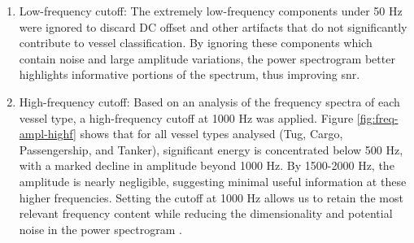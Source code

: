 \begin{enumerate}
    \item Low-frequency cutoff: The extremely low-frequency components under 50 Hz were ignored to discard DC offset and other artifacts that do not significantly contribute to vessel classification. By ignoring these components which contain noise and large amplitude variations, the power spectrogram better highlights informative portions of the spectrum, thus improving \acrshort{snr}.
    \item High-frequency cutoff: Based on an analysis of the frequency spectra of each vessel type, a high-frequency cutoff at 1000 Hz was applied. Figure \ref{fig:freq-ampl-highf} shows that for all vessel types analysed (Tug, Cargo, Passengership, and Tanker), significant energy is concentrated below 500 Hz, with a marked decline in amplitude beyond 1000 Hz. By 1500-2000 Hz, the amplitude is nearly negligible, suggesting minimal useful information at these higher frequencies. Setting the cutoff at 1000 Hz allows us to retain the most relevant frequency content while reducing the dimensionality and potential noise in the power spectrogram \cite{premus_machine_2020}. 
\end{enumerate}

